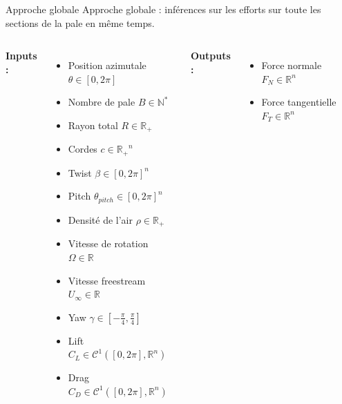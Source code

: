 \documentclass[
11pt,notheorems,hyperref={pdfauthor=whatever}
]{beamer}
\begin{document}
\begin{frame}{Approche globale}
Approche globale : inférences sur les efforts sur toute les sections de la pale en même temps.

    \vspace{0.3cm}

    \begin{columns}[c]
        \textbf{Inputs :}
        \begin{itemize}\small
            \item Position azimutale $\theta \in \left[0,2\pi\right]$
            \item Nombre de pale $B \in \mathbb{N^*}$
            \item Rayon total $R\in \mathbb{R_+}$
            \item Cordes $c\in \mathbb{R_+}^n$
            \item Twist $\beta \in \left[0,2\pi\right]^n$
            \item Pitch $\theta_{pitch} \in \left[0,2\pi\right]^n$
            \item Densité de l'air $\rho \in \mathbb{R_+}$
            \item Vitesse de rotation $\Omega \in \mathbb{R}$
            \item Vitesse freestream $U_{\infty} \in \mathbb{R}$
            \item Yaw $\gamma \in \left[-\frac{\pi}{4}, \frac{\pi}{4}\right]$
            \item Lift $C_L \in \mathcal{C^1}(\left[0,2\pi\right], \mathbb{R}^n)$
            \item Drag $C_D \in \mathcal{C^1}(\left[0,2\pi\right], \mathbb{R}^n)$
        \end{itemize}

        \centering

        \textbf{Outputs :}
        \begin{itemize}\small
            \item Force normale $F_N \in \mathbb{R}^n$
            \item Force tangentielle $F_T \in \mathbb{R}^n$
        \end{itemize}
    \end{columns}    
\end{frame}
\end{document}
